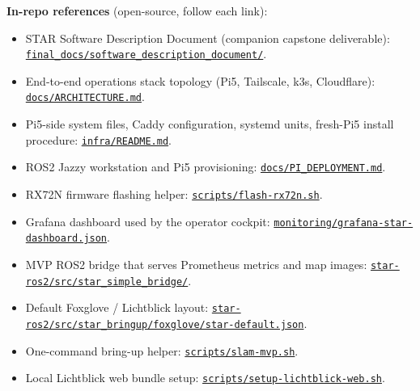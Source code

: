 \documentclass[11pt,letterpaper]{article}
\begin{document}
\textbf{In-repo references} (open-source, follow each link):
\begin{itemize}[leftmargin=1.4em,itemsep=2pt]
\item STAR Software Description Document (companion capstone
      deliverable):
      \href{https://github.com/Locked-Inc/STAR/tree/main/final_docs/software_description_document}{\texttt{final\_docs/software\_description\_document/}}.
\item End-to-end operations stack topology (Pi5, Tailscale, k3s,
      Cloudflare):
      \href{https://github.com/Locked-Inc/STAR/blob/main/docs/ARCHITECTURE.md}{\texttt{docs/ARCHITECTURE.md}}.
\item Pi5-side system files, Caddy configuration, systemd units,
      fresh-Pi5 install procedure:
      \href{https://github.com/Locked-Inc/STAR/blob/main/infra/README.md}{\texttt{infra/README.md}}.
\item ROS2 Jazzy workstation and Pi5 provisioning:
      \href{https://github.com/Locked-Inc/STAR/blob/main/docs/PI_DEPLOYMENT.md}{\texttt{docs/PI\_DEPLOYMENT.md}}.
\item RX72N firmware flashing helper:
      \href{https://github.com/Locked-Inc/STAR/blob/main/scripts/flash-rx72n.sh}{\texttt{scripts/flash-rx72n.sh}}.
\item Grafana dashboard used by the operator cockpit:
      \href{https://github.com/Locked-Inc/STAR/blob/main/monitoring/grafana-star-dashboard.json}{\texttt{monitoring/grafana-star-dashboard.json}}.
\item MVP ROS2 bridge that serves Prometheus metrics and map images:
      \href{https://github.com/Locked-Inc/STAR/tree/main/star-ros2/src/star_simple_bridge}{\texttt{star-ros2/src/star\_simple\_bridge/}}.
\item Default Foxglove / Lichtblick layout:
      \href{https://github.com/Locked-Inc/STAR/blob/main/star-ros2/src/star_bringup/foxglove/star-default.json}{\texttt{star-ros2/src/star\_bringup/foxglove/star-default.json}}.
\item One-command bring-up helper:
      \href{https://github.com/Locked-Inc/STAR/blob/main/scripts/slam-mvp.sh}{\texttt{scripts/slam-mvp.sh}}.
\item Local Lichtblick web bundle setup:
      \href{https://github.com/Locked-Inc/STAR/blob/main/scripts/setup-lichtblick-web.sh}{\texttt{scripts/setup-lichtblick-web.sh}}.
\end{itemize}
\end{document}
